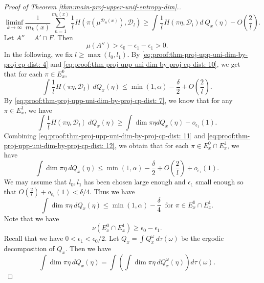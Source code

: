 \documentclass[a4paper,11pt]{amsart}
\theoremstyle{definition}
\numberwithin{equation}{section}
\def\to{\rightarrow}
\def\D{\mathcal{D}}
\begin{document}
\begin{proof}[Proof of Theorem \ref{thm:main-proj-upper-unif-entropy-dim}.]
\begin{equation}\label{eq:proof:thm-proj-upp-uni-dim-by-proj-cp-dist: 10}
\liminf_{k\to\infty}\frac{1}{m_k(x)}\sum_{n=1}^{m_k(x)}  \frac{1}{l}H(\pi(\mu^{\D_n(x)}),\D_l)   \ge   \int  \frac{1}{l}H(\pi\eta,\D_l) d \ Q_x(\eta) - O\left(\frac{2}{l}\right).
\end{equation}
Let $A''=A'\cap F$. Then 
\[\mu(A'')>\epsilon_0-\epsilon_1-\epsilon_1>0.\] 
In the following, we fix $l\ge \max(l_0,l_1)$.
By \eqref{eq:proof:thm-proj-upp-uni-dim-by-proj-cp-dist: 4} and \eqref{eq:proof:thm-proj-upp-uni-dim-by-proj-cp-dist: 10},  we get that for each $\pi\in E_x^0$, 
\begin{equation}\label{eq:proof:thm-proj-upp-uni-dim-by-proj-cp-dist: 11}
\int  \frac{1}{l}H(\pi\eta,\D_l) \ d Q_x(\eta) \le \min(1,\alpha)-\frac{\delta}{2} + O\left(\frac{2}{l}\right).
\end{equation}
By \eqref{eq:proof:thm-proj-upp-uni-dim-by-proj-cp-dist: 7},  we know that for any $\pi\in E_x^1$,  we have
\begin{equation}\label{eq:proof:thm-proj-upp-uni-dim-by-proj-cp-dist: 12}
\int  \frac{1}{l}H(\pi\eta,\D_l) \ d Q_x(\eta) \ge \int \dim \pi\eta dQ_x(\eta)- o_{\epsilon_1}(1).
\end{equation}
Combining \eqref{eq:proof:thm-proj-upp-uni-dim-by-proj-cp-dist: 11} and \eqref{eq:proof:thm-proj-upp-uni-dim-by-proj-cp-dist: 12},  we obtain that for each $\pi\in  E_x^0\cap  E_x^1$,  we have 
\[
 \int \dim \pi\eta \ dQ_x(\eta)\le  \min(1,\alpha)-\frac{\delta}{2} + O\left(\frac{2}{l}\right) +o_{\epsilon_1}(1).
\]
We may assume that $l_0, l_1$ has been chosen large enough and $\epsilon_1$ small enough so that $O\left(\frac{2}{l}\right) +o_{\epsilon_1}(1)<\delta/4$.  Thus we have
\begin{equation}\label{eq:proof:thm-proj-upp-uni-dim-by-proj-cp-dist: 13}
 \int \dim \pi\eta \  dQ_x(\eta)\le  \min(1,\alpha)-\frac{\delta}{4} \ \textrm{ for } \pi\in E_x^0\cap E_x^1.
\end{equation}
Note that we have 
\begin{equation}\label{eq:proof:thm-proj-upp-uni-dim-by-proj-cp-dist: 14}
 \nu(E_x^0\cap E_x^1)\ge \epsilon_0-\epsilon_1.
\end{equation}
Recall that we have $0<\epsilon_1<\epsilon_0/2$.
Let $Q_x=\int Q_x^\omega \ d\tau(\omega)$ be the ergodic decomposition of $Q_x$. Then we have 
\begin{equation}\label{eq:proof:thm-proj-upp-uni-dim-by-proj-cp-dist: 15}
\int \dim \pi\eta \ dQ_x(\eta) = \int \left(\int \dim \pi\eta \ dQ_x^\omega(\eta)\right)  d\tau(\omega).

\end{equation}
\end{proof}
\end{document}
